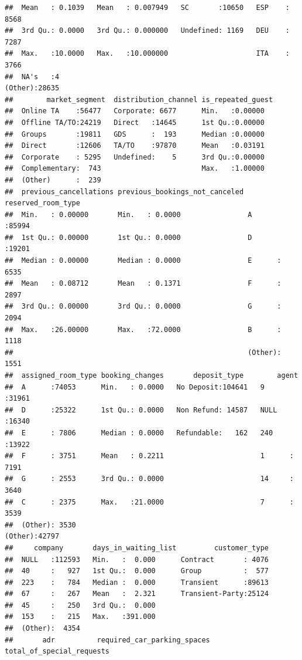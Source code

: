 \documentclass[
]{article}
\begin{document}
\begin{verbatim}
##  Mean   : 0.1039   Mean   : 0.007949   SC       :10650   ESP    : 8568  
##  3rd Qu.: 0.0000   3rd Qu.: 0.000000   Undefined: 1169   DEU    : 7287  
##  Max.   :10.0000   Max.   :10.000000                     ITA    : 3766  
##  NA's   :4                                               (Other):28635  
##        market_segment  distribution_channel is_repeated_guest
##  Online TA    :56477   Corporate: 6677      Min.   :0.00000  
##  Offline TA/TO:24219   Direct   :14645      1st Qu.:0.00000  
##  Groups       :19811   GDS      :  193      Median :0.00000  
##  Direct       :12606   TA/TO    :97870      Mean   :0.03191  
##  Corporate    : 5295   Undefined:    5      3rd Qu.:0.00000  
##  Complementary:  743                        Max.   :1.00000  
##  (Other)      :  239                                         
##  previous_cancellations previous_bookings_not_canceled reserved_room_type
##  Min.   : 0.00000       Min.   : 0.0000                A      :85994     
##  1st Qu.: 0.00000       1st Qu.: 0.0000                D      :19201     
##  Median : 0.00000       Median : 0.0000                E      : 6535     
##  Mean   : 0.08712       Mean   : 0.1371                F      : 2897     
##  3rd Qu.: 0.00000       3rd Qu.: 0.0000                G      : 2094     
##  Max.   :26.00000       Max.   :72.0000                B      : 1118     
##                                                        (Other): 1551     
##  assigned_room_type booking_changes       deposit_type        agent      
##  A      :74053      Min.   : 0.0000   No Deposit:104641   9      :31961  
##  D      :25322      1st Qu.: 0.0000   Non Refund: 14587   NULL   :16340  
##  E      : 7806      Median : 0.0000   Refundable:   162   240    :13922  
##  F      : 3751      Mean   : 0.2211                       1      : 7191  
##  G      : 2553      3rd Qu.: 0.0000                       14     : 3640  
##  C      : 2375      Max.   :21.0000                       7      : 3539  
##  (Other): 3530                                            (Other):42797  
##     company       days_in_waiting_list         customer_type  
##  NULL   :112593   Min.   :  0.000      Contract       : 4076  
##  40     :   927   1st Qu.:  0.000      Group          :  577  
##  223    :   784   Median :  0.000      Transient      :89613  
##  67     :   267   Mean   :  2.321      Transient-Party:25124  
##  45     :   250   3rd Qu.:  0.000                             
##  153    :   215   Max.   :391.000                             
##  (Other):  4354                                               
##       adr          required_car_parking_spaces total_of_special_requests

\end{verbatim}
\end{document}
